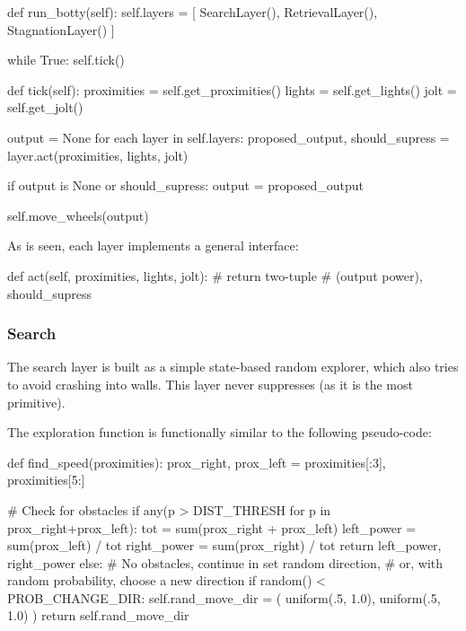 \documentclass[a4paper,10pt]{article}
\begin{document}
\begin{python}
def run_botty(self):
    self.layers = [
        SearchLayer(),
        RetrievalLayer(),
        StagnationLayer()
    ]

    while True:
        self.tick()

def tick(self):
    proximities = self.get_proximities()
    lights      = self.get_lights()
    jolt        = self.get_jolt()

    output = None
    for each layer in self.layers:
        proposed_output, should_supress = layer.act(proximities, 
                                                    lights, jolt)

        if output is None or should_supress:
            output = proposed_output

    self.move_wheels(output)
\end{python}

As is seen, each layer implements a general interface: 
\begin{python}
def act(self, proximities, lights, jolt):
    # return two-tuple 
    # (output power), should_supress
\end{python}

\subsubsection{Search}
The search layer is built as a simple state-based random explorer, which also
tries to avoid crashing into walls.  This layer never suppresses (as it is the
most primitive). 

The exploration function is functionally similar to the following pseudo-code:

\begin{python}
def find_speed(proximities):
    prox_right, prox_left = proximities[:3], proximities[5:]

    # Check for obstacles
    if any(p > DIST_THRESH for p in prox_right+prox_left):
        tot         = sum(prox_right + prox_left)
        left_power  = sum(prox_left)  / tot
        right_power = sum(prox_right) / tot
        return left_power, right_power
    else:
        # No obstacles, continue in set random direction,
        # or, with random probability, choose a new direction
        if random() < PROB_CHANGE_DIR:
            self.rand_move_dir = (
                uniform(.5, 1.0), 
                uniform(.5, 1.0)
            )
        return self.rand_move_dir
\end{python}
\end{document}

